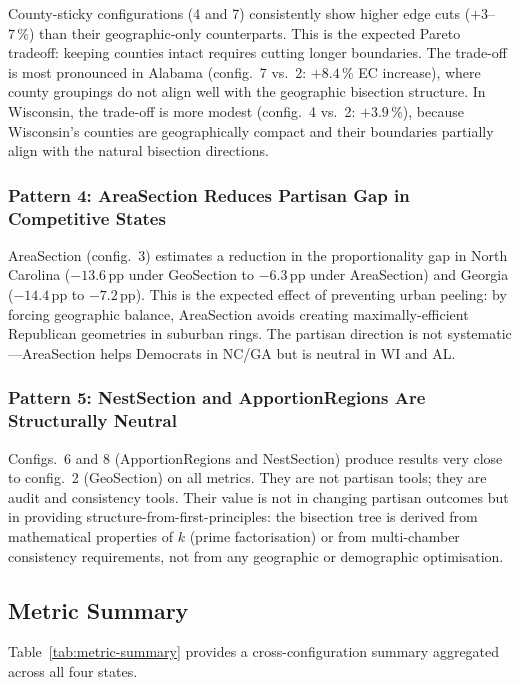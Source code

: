 County-sticky configurations (4 and 7) consistently show higher edge cuts
($+3$--$7\,\%$) than their geographic-only counterparts.
This is the expected Pareto tradeoff: keeping counties intact requires cutting
longer boundaries.
The trade-off is most pronounced in Alabama (config.~7 vs.~2: $+8.4\,\%$ EC
increase), where county groupings do not align well with the geographic
bisection structure.
In Wisconsin, the trade-off is more modest (config.~4 vs.~2: $+3.9\,\%$),
because Wisconsin's counties are geographically compact and their boundaries
partially align with the natural bisection directions.

\subsubsection*{Pattern 4: AreaSection Reduces Partisan Gap in Competitive States}

AreaSection (config.~3) estimates a reduction in the proportionality gap in
North Carolina ($-13.6$\,pp under GeoSection to $-6.3$\,pp under AreaSection)
and Georgia ($-14.4$\,pp to $-7.2$\,pp).
This is the expected effect of preventing urban peeling: by forcing geographic
balance, AreaSection avoids creating maximally-efficient Republican geometries
in suburban rings.
The partisan direction is not systematic---AreaSection helps Democrats in NC/GA
but is neutral in WI and AL.

\subsubsection*{Pattern 5: NestSection and ApportionRegions Are Structurally Neutral}

Configs.~6 and 8 (ApportionRegions and NestSection) produce results very close
to config.~2 (GeoSection) on all metrics.
They are not partisan tools; they are audit and consistency tools.
Their value is not in changing partisan outcomes but in providing
structure-from-first-principles: the bisection tree is derived from mathematical
properties of $k$ (prime factorisation) or from multi-chamber consistency
requirements, not from any geographic or demographic optimisation.

\subsection{Metric Summary}

Table~\ref{tab:metric-summary} provides a cross-configuration summary aggregated
across all four states.

